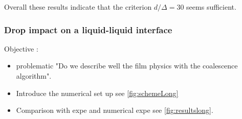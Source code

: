 Overall these results indicate that the criterion $d/\Delta = 30$ seems sufficient.

\subsubsection{Drop impact on a liquid-liquid interface}
Objective : 
\begin{itemize}
    \item problematic "Do we describe well the film physics with the coalescence algorithm".
    \item Introduce the numerical set up  see \ref{fig:schemeLong}
    \item Comparison  with expe \citet{mohamed2003drop} and numerical expe \citet{balcazar2015multiple} see \ref{fig:resultslong}.  
\end{itemize}

